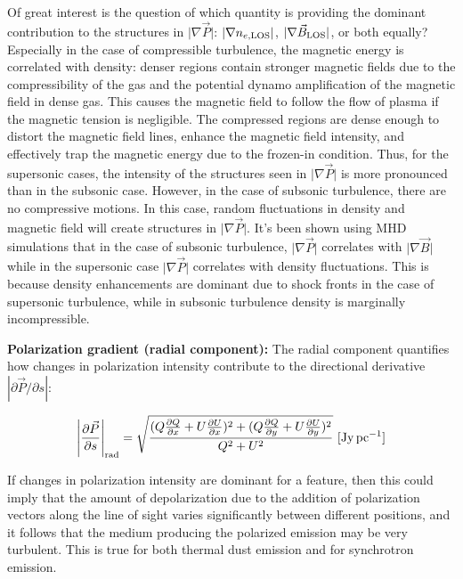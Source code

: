 \documentclass[a4paper,10pt]{article}
\begin{document}
{\noindent}Of great interest is the question of which quantity is providing the dominant contribution to the structures in $\lvert\nabla\vec{P}\rvert$: $\lvert\nabla n_{e,{\rm LOS}} \rvert$, $\lvert\nabla\vec{B}_{\rm LOS}\rvert$, or both equally? Especially in the case of compressible turbulence, the magnetic energy is correlated with density: denser regions contain stronger magnetic fields due to the compressibility of the gas and the potential dynamo amplification of the magnetic field in dense gas. This causes the magnetic field to follow the flow of plasma if the magnetic tension is negligible. The compressed regions are dense enough to distort the magnetic field lines, enhance the magnetic field intensity, and effectively trap the magnetic energy due to the frozen-in condition. Thus, for the supersonic cases, the intensity of the structures seen in $\lvert\nabla\vec{P}\rvert$ is more pronounced than in the subsonic case. However, in the case of subsonic turbulence, there are no compressive motions. In this case, random fluctuations in density and magnetic field will create structures in $\lvert\nabla\vec{P}\rvert$. It's been shown using MHD simulations that in the case of subsonic turbulence, $\lvert\nabla\vec{P}\rvert$ correlates with $\lvert\nabla\vec{B}\rvert$ while in the supersonic case $\lvert\nabla\vec{P}\rvert$ correlates with density fluctuations. This is because density enhancements are dominant due to shock fronts in the case of supersonic turbulence, while in subsonic turbulence density is marginally incompressible.

{\noindent}\textbf{Polarization gradient (radial component):} The radial component quantifies how changes in polarization intensity contribute to the directional derivative $|\partial\vec{P}/\partial s|$:

\begin{align*}
    \left\lvert\frac{\partial\vec{P}}{\partial s}\right\rvert_\mathrm{rad} = \sqrt{\frac{(Q\frac{\partial Q}{\partial x} + U\frac{\partial U}{\partial x})^2 + (Q\frac{\partial Q}{\partial y} + U\frac{\partial U}{\partial y})^2}{Q^2+U^2}} ~ [{\rm Jy\,pc^{-1}}]
\end{align*}

{\noindent}If changes in polarization intensity are dominant for a feature, then this could imply that the amount of depolarization due to the addition of polarization vectors along the line of sight varies significantly between different positions, and it follows that the medium producing the polarized emission may be very turbulent. This is true for both thermal dust emission and for synchrotron emission.
\end{document}
